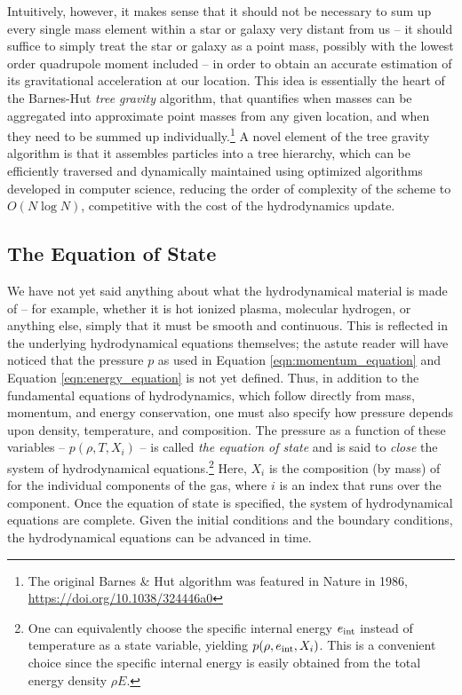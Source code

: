 \documentclass[notoc]{tufte-handout}
\begin{document}
Intuitively, however, it makes sense that it should not be necessary to sum up every single mass element within a star or galaxy very distant from us -- it should suffice to simply treat the star or galaxy as a point mass, possibly with the lowest order quadrupole moment included -- in order to obtain an accurate estimation of its gravitational acceleration at our location. This idea is essentially the heart of the Barnes-Hut {\it tree gravity} algorithm, that quantifies when masses can be aggregated into approximate point masses from any given location, and when they need to be summed up individually.\footnote {The original Barnes \& Hut algorithm was featured in Nature in 1986, \url {https://doi.org/10.1038/324446a0}}  A novel element of the tree gravity algorithm is that it assembles particles into a tree hierarchy, which can be efficiently traversed and dynamically maintained using optimized algorithms developed in computer science, reducing the order of complexity of the scheme to $O(N \log N)$, competitive with the cost of the hydrodynamics update. 


\subsection{The Equation of State}

We have not yet said anything about what the hydrodynamical material is made of -- for example, whether it is hot ionized plasma, molecular hydrogen, or anything else, simply that it must be smooth and continuous. This is reflected in the underlying hydrodynamical equations themselves; the astute reader will have noticed that the pressure $p$ as used in Equation \ref {eqn:momentum_equation} and Equation \ref {eqn:energy_equation} is not yet defined. Thus, in addition to the fundamental equations of hydrodynamics, which follow directly from mass, momentum, and energy conservation, one must also specify how pressure depends upon density, temperature, and composition. The pressure as a function of these variables -- $p (\rho, T, X_i)$ -- is called {\it the equation of state} and is said to {\it close} the system of hydrodynamical equations.\footnote {One can equivalently choose the specific internal energy $e_{\rm int}$ instead of temperature as a state variable, yielding $p (\rho, e_{\rm int}, X_i)$. This is a convenient choice since the specific internal energy is easily obtained from the total energy density $\rho E$.}  Here, $X_i$ is the composition (by mass) of for the individual components of the gas, where $i$ is an index that runs over the component. Once the equation of state is specified, the system of hydrodynamical equations are complete. Given the initial conditions and the boundary conditions, the hydrodynamical equations can be advanced in time.
\end{document}
